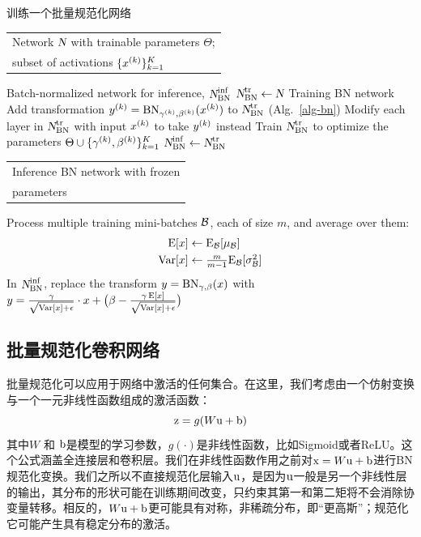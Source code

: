 \documentclass[twocolumn]{article}
\begin{document}
\begin{algorithm}
\caption{训练一个批量规范化网络}
\label{alg-train}
\begin{algorithmic}[1]
\REQUIRE 
\begin{tabular}[t]{@{}l}
Network $\norig$ with trainable  parameters $\Theta$;\\
 subset of activations $\{x^\kk\}_{k=1}^K$
 \end{tabular}
\ENSURE  Batch-normalized network  for inference, $\ninf$
\STATE $\ntrain\leftarrow \norig$ \quad \COMMENT Training BN network
\STATE 
Add transformation $y^\kk = \BN{x^\kk}{\gamma^\kk,\beta^\kk}$  to $\ntrain$ (Alg.~\ref{alg-bn})
\STATE
Modify each layer in $\ntrain$ with input $x^\kk$ to take $y^\kk$ instead
\ENDFOR
\STATE
Train $\ntrain$ to optimize the parameters $\Theta\cup 
\{\gamma^\kk, \beta^\kk\}_{k=1}^K$
\STATE \vspace{.03in}
$\ninf\leftarrow\ntrain$\quad \begin{tabular}[t]{@{}l}\COMMENT Inference BN network with frozen\\ \COMMENT parameters \end{tabular}
\STATE {}
\STATE Process multiple training mini-batches  $\setB$, each of size $m$, and average over them:
\vspace{-.1in}
\begin{align*}
\E[x] &\leftarrow \E_\setB[\mu_\setB]\\
 \Var[x] &\leftarrow \textstyle \frac{m}{m-1}\E_\setB[\sigma_\setB^2]
 \end{align*}
\STATE 
\vspace{-.1in}
In $\ninf$, replace the transform $y=\BN{x}{\gamma,\beta}$ with\, $y = \frac{\gamma}{\sqrt{\Var[x]+\epsilon}}\cdot x + \big(\beta - \frac{\gamma\,\E[x]}{\sqrt{\Var[x]+\epsilon}}\big)$
\ENDFOR
\end{algorithmic}
\end{algorithm}

\subsection{批量规范化卷积网络}
\label{sec-conv}

批量规范化可以应用于网络中激活的任何集合。在这里，我们考虑由一个仿射变换与一个一元非线性函数组成的激活函数：$$\vz = g(W\vu+\vb)$$其中$W$ 和 $\vb$是模型的学习参数，$g(\cdot)$是非线性函数，比如Sigmoid或者ReLU。这个公式涵盖全连接层和卷积层。我们在非线性函数作用之前对$\vx=W\vu+\vb$进行BN规范化变换。我们之所以不直接规范化层输入$\vu$，是因为$\vu$一般是另一个非线性层的输出，其分布的形状可能在训练期间改变，只约束其第一和第二矩将不会消除协变量转移。相反的，$W\vu+\vb$更可能具有对称，非稀疏分布，即“更高斯”；规范化它可能产生具有稳定分布的激活。
\end{document}
